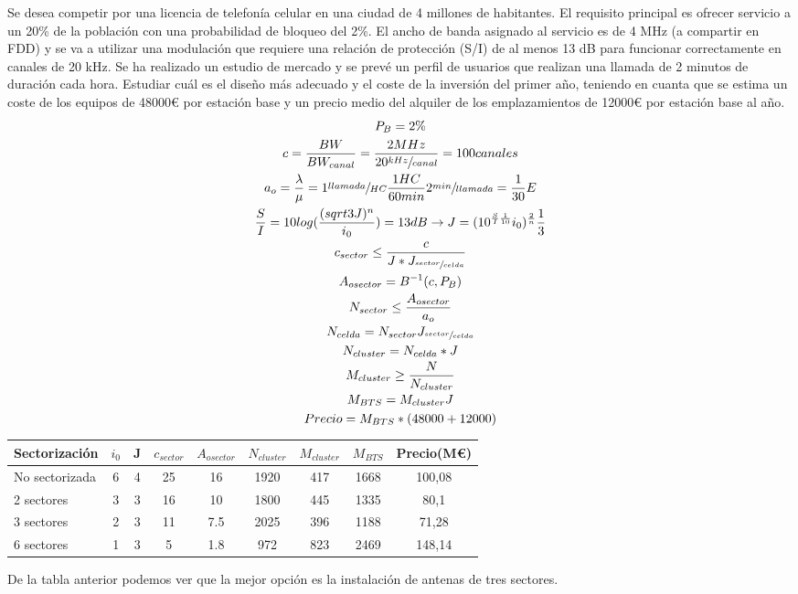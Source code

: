 \begin{exercise}[3]
	Se desea competir por una licencia de telefonía celular en una ciudad de 4 millones de habitantes. El requisito principal es ofrecer servicio a un 20\% de la población con una probabilidad de bloqueo del 2\%. El ancho de banda asignado al servicio es de 4 MHz (a compartir en FDD) y se va a utilizar una modulación que requiere una relación de protección (S/I) de al menos 13 dB para funcionar correctamente en canales de 20 kHz. Se ha realizado un estudio de mercado y se prevé un perfil de usuarios que realizan una llamada de 2 minutos de duración cada hora. Estudiar cuál es el diseño más adecuado y el coste de la inversión del primer año, teniendo en cuanta que se estima un coste de los equipos de 48000€ por estación base y un precio medio del alquiler de los emplazamientos de 12000€ por estación base al año.\\
	\begin{gather*}
		P_B=2\%\\
		c=\frac{BW}{BW_{canal}}=\frac{2MHz}{20\sfrac{kHz}{canal}}=100canales\\
		a_o=\frac{\lambda}{\mu}=1\sfrac{llamada}{HC}\frac{1HC}{60min}2\sfrac{min}{llamada}=\frac{1}{30}E\\
		\frac{S}{I}=10log(\frac{(sqrt{3J})^n}{i_0})=13dB\to J=(10^{\frac{S}{I}\frac{1}{10}}i_0)^{\frac{2}{n}}\frac{1}{3}\\
		c_{sector}\leq\frac{c}{J*J_{\sfrac{sector}{celda}}}\\
		A_{osector}=B^{-1}(c,P_B)\\
		N_{sector}\leq\frac{A_{osector}}{a_o}\\
		N_{celda}=N_{sector}J_{\sfrac{sector}{celda}}\\
		N_{cluster}=N_{celda}*J\\
		M_{cluster}\geq\frac{N}{N_{cluster}}\\
		M_{BTS}=M_{cluster}J\\
		Precio=M_{BTS}*(48000+12000)
	\end{gather*}
	\begin{center}
	\begin{tabular}{l|c|c|c|c|c|c|c|c}
		Sectorización  	& $i_0$	& J & $c_{sector}$  & $A_{osector}$ & $N_{cluster}$ & $M_{cluster}$ 	& $M_{BTS}$ & Precio(M€) 	\\\hline
		No sectorizada 	& 6	& 4 & 25	& 16	& 1920	& 417 & 1668 & 100,08	\\\hline
		2 sectores		& 3	& 3 & 16	& 10	& 1800	& 445 & 1335 & 80,1		\\\hline
		3 sectores		& 2	& 3 & 11	& 7.5	& 2025	& 396 & 1188 & 71,28	\\\hline
		6 sectores		& 1	& 3 & 5		& 1.8	& 972	& 823 & 2469 & 148,14	\\\hline
	\end{tabular}
	\end{center}
	De la tabla anterior podemos ver que la mejor opción es la instalación de antenas de tres sectores.
\end{exercise}
